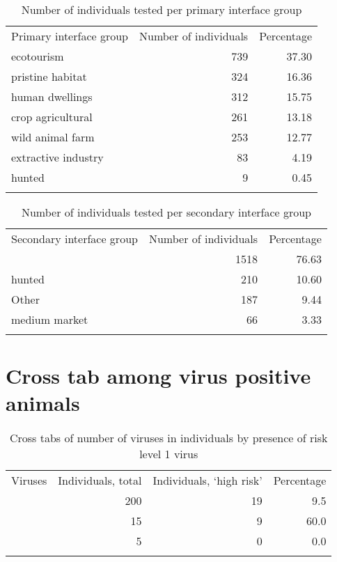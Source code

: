 \documentclass[11pt,article,oneside]{article}
\begin{document}
\begin{longtable}[c]{@{}lrr@{}}
\toprule\addlinespace
Primary interface group & Number of individuals & Percentage
\\\addlinespace
\midrule\endhead
ecotourism & 739 & 37.30
\\\addlinespace
pristine habitat & 324 & 16.36
\\\addlinespace
human dwellings & 312 & 15.75
\\\addlinespace
crop agricultural & 261 & 13.18
\\\addlinespace
wild animal farm & 253 & 12.77
\\\addlinespace
extractive industry & 83 & 4.19
\\\addlinespace
hunted & 9 & 0.45
\\\addlinespace
\bottomrule
\addlinespace
\caption{Number of individuals tested per primary interface group}
\end{longtable}

\begin{longtable}[c]{@{}lrr@{}}
\toprule\addlinespace
Secondary interface group & Number of individuals & Percentage
\\\addlinespace
\midrule\endhead
& 1518 & 76.63
\\\addlinespace
hunted & 210 & 10.60
\\\addlinespace
Other & 187 & 9.44
\\\addlinespace
medium market & 66 & 3.33
\\\addlinespace
\bottomrule
\addlinespace
\caption{Number of individuals tested per secondary interface group}
\end{longtable}

\section{Cross tab among virus positive
animals}\label{cross-tab-among-virus-positive-animals}

\begin{longtable}[c]{@{}rrrr@{}}
\toprule\addlinespace
Viruses & Individuals, total & Individuals, `high risk' & Percentage
\\\addlinespace
\midrule\endhead
1 & 200 & 19 & 9.5
\\\addlinespace
2 & 15 & 9 & 60.0
\\\addlinespace
3 & 5 & 0 & 0.0
\\\addlinespace
\bottomrule
\addlinespace
\caption{Cross tabs of number of viruses in individuals by presence of
risk level 1 virus}
\end{longtable}
\end{document}
